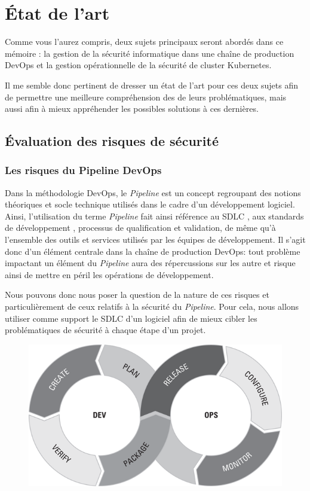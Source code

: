 \chapter{État de l'art}

Comme vous l'aurez compris, deux sujets principaux seront abordés dans ce mémoire : la gestion de la sécurité 
informatique dans une chaîne de production DevOps et la gestion opérationnelle de la sécurité de cluster Kubernetes. 

Il me semble donc pertinent de dresser un état de l'art pour ces deux sujets afin de permettre une meilleure 
compréhension des de leurs problématiques, mais aussi afin à mieux appréhender les possibles solutions à ces dernières.

\section{Évaluation des risques de sécurité}
\subsection{Les risques du Pipeline DevOps}

Dans la méthodologie DevOps, le \emph{Pipeline} est un concept regroupant des notions théoriques et socle technique 
utilisés dans le cadre d'un développement logiciel. Ainsi, l'utilisation du terme \emph{Pipeline} fait ainsi référence 
au \ac{SDLC} \autocite[Ch.\ 6]{devops_for_dummies_freeman_forsgren_2019}, aux standards de développement
\autocite[Ch.\ 9]{devops_for_dummies_freeman_forsgren_2019}, processus de qualification et validation, de même qu'à
l'ensemble des outils et services utilisés par les équipes de développement. Il s'agit donc d'un élément centrale dans 
la chaîne de production DevOps: tout problème impactant un élément du \emph{Pipeline} aura des répercussions sur les 
autre et risque ainsi de mettre en péril les opérations de développement.

Nous pouvons donc nous poser la question de la nature de ces risques et particulièrement de ceux relatifs à la sécurité
du \emph{Pipeline}. Pour cela, nous allons utiliser comme support le \ac{SDLC} d'un logiciel afin de mieux cibler les 
problématiques de sécurité à chaque étape d'un projet.

\vspace{2em}
\begin{figure}[h]
    \centering
    \includegraphics[width=0.5\linewidth]{resources/img/devops_lifecycle.png}
    \label{fig:devops-lifecycle}
\end{figure}
\newpage

